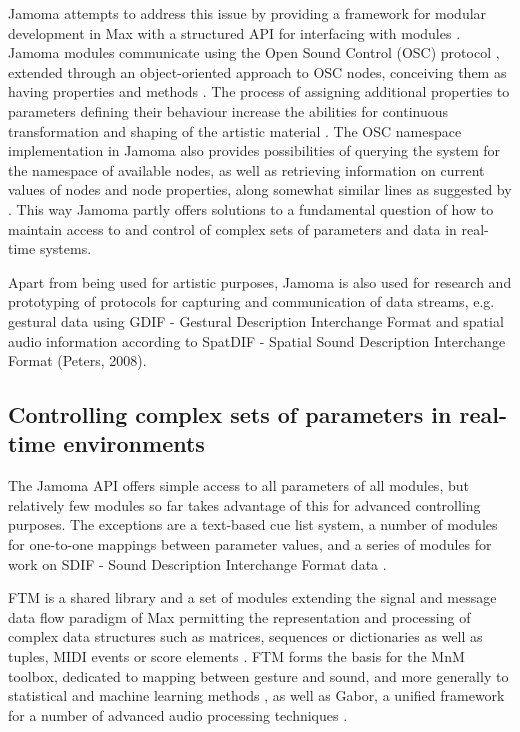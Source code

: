 \documentclass{article}
\begin{document}
Jamoma  attempts to address this issue by providing a framework for modular development in Max with a structured API for interfacing with modules \cite{Place:2006jamoma}. Jamoma modules communicate using the Open Sound Control (OSC) protocol \cite{Wright_2002_OSC}, extended through an object-oriented approach to OSC nodes, conceiving them as having properties and methods \cite{Place:2008osc_properties}. The process of assigning additional properties to parameters defining their behaviour increase the abilities for continuous transformation and shaping of the artistic material \cite{Place_2008_flexible_control}. The OSC namespace implementation in Jamoma also provides possibilities of querying the system for the namespace of available nodes, as well as retrieving information on current values of nodes and node properties, along somewhat similar lines as suggested by \cite{Jazzmutant:2006_osc2}. This way Jamoma partly offers solutions to a fundamental question of how to maintain access to and control of complex sets of parameters and data in real-time systems.

Apart from being used for artistic purposes, Jamoma is also used for research and prototyping of protocols for capturing and communication of data streams, e.g. gestural data using GDIF - Gestural Description Interchange Format \cite{Jensenius:2006a, Nymoen_2008_GDIF_sync} and spatial audio information according to SpatDIF - Spatial Sound Description Interchange Format (Peters, 2008).

\subsection{Controlling complex sets of parameters in real-time environments}

The Jamoma  API offers simple access to all parameters of all modules, but relatively few modules so far takes advantage of this for advanced controlling purposes. The exceptions are a text-based cue list system, a number of modules for one-to-one mappings between parameter values, and a series of modules for work on SDIF - Sound Description Interchange Format data \cite{Nymoen_2008_GDIF_sync}.

FTM is a shared library and a set of modules extending the signal and message data ﬂow paradigm of Max permitting the representation and processing of complex data structures such as matrices, sequences or dictionaries as well as tuples, MIDI events or score elements \cite{Schnell:2005ftm}. FTM forms the basis for the MnM toolbox, dedicated to mapping between gesture and sound, and more generally to statistical and machine learning methods \cite{Bevilacqua:2005mnm}, as well as Gabor, a unified framework for a number of advanced audio processing techniques \cite{Schnell_2005_Gabor}.
\end{document}
